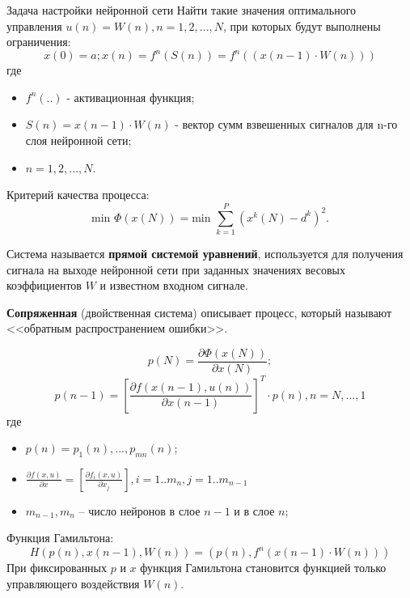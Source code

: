 \documentclass{beamer}
\begin{document}
\begin{frame}[t]{Задача настройки нейронной сети}
	Найти такие значения оптимального управления $u(n)=W(n), n=1,2,...,N$, при которых будут выполнены ограничения:
	\[
	x(0)=a; x(n)=f^n(S(n))=f^n((x(n-1)\cdot W(n)))
	\]
	где 
	\begin{itemize}
		\item $f^n(..)$ - активационная функция;
		\item $S(n)=x(n-1)\cdot W(n)$ - вектор сумм взвешенных сигналов для n-го слоя нейронной сети;
		\item $n=1,2,...,N$.
	\end{itemize}
	Критерий качества процесса: 
	\[
	\text{min }\Phi(x(N))=\text{min } \sum_{k=1}^P (x^k(N)-d^k)^2.
	\]
	
	Система называется \textbf{прямой системой уравнений}, используется для получения сигнала на выходе нейронной сети при заданных значениях весовых коэффициентов $W$ и известном входном сигнале.
\end{frame}

\begin{frame}[t]
	\begin{block}{\textbf{Сопряженная} (двойственная система)}
		описывает процесс, который называют <<обратным распространением ошибки>>.
	\end{block}	
	\[p(N)=\frac{\partial \Phi(x(N))}{\partial x(N)};\]
	\[p(n-1) = \left[\frac{\partial f(x(n-1), u(n))}{\partial x(n-1)}\right]^T\cdot p(n), n=N,...,1\]
	где 
	\begin{itemize}
		\item $p(n)={p_1(n),...,p_{mn}(n)}$;
		\item $\frac{\partial f(x,u)}{\partial x} = \left[\frac{\partial f_i(x,u)}{\partial x_j}\right], i=1..m_n, j=1..m_{n-1}$
		\item $m_{n-1}, m_n$ -- число нейронов в слое $n-1$ и в слое $n$;
	\end{itemize}
	Функция Гамильтона:
	\[H(p(n),x(n-1),W(n))=(p(n), f^n(x(n-1)\cdot W(n)))\]
	При фиксированных $p$ и $x$ функция Гамильтона становится функцией только управляющего воздействия $W(n)$.
\end{frame}
\end{document}
